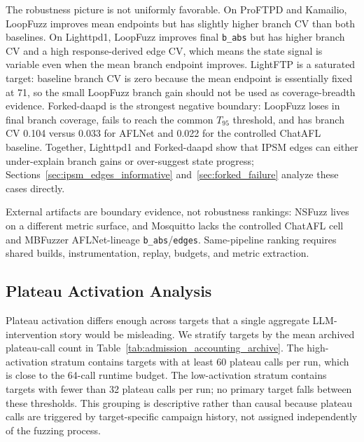 \documentclass[final,5p,times,number]{elsarticle}
\begin{document}
The robustness picture is not uniformly favorable. On ProFTPD and Kamailio, LoopFuzz improves mean endpoints but has slightly higher branch CV than both baselines. On Lighttpd1, LoopFuzz improves final \texttt{b\_abs} but has higher branch CV and a high response-derived edge CV, which means the state signal is variable even when the mean branch endpoint improves. LightFTP is a saturated target: baseline branch CV is zero because the mean endpoint is essentially fixed at 71, so the small LoopFuzz branch gain should not be used as coverage-breadth evidence. Forked-daapd is the strongest negative boundary: LoopFuzz loses in final branch coverage, fails to reach the common $T_{95}$ threshold, and has branch CV 0.104 versus 0.033 for AFLNet and 0.022 for the controlled ChatAFL baseline. Together, Lighttpd1 and Forked-daapd show that IPSM edges can either under-explain branch gains or over-suggest state progress; Sections~\ref{sec:ipsm_edges_informative} and~\ref{sec:forked_failure} analyze these cases directly.

External artifacts are boundary evidence, not robustness rankings: NSFuzz lives on a different metric surface, and Mosquitto lacks the controlled ChatAFL cell and MBFuzzer AFLNet-lineage \texttt{b\_abs}/\texttt{edges}. Same-pipeline ranking requires shared builds, instrumentation, replay, budgets, and metric extraction.

\subsection{Plateau Activation Analysis}
\label{sec:plateau_activation_analysis}

Plateau activation differs enough across targets that a single aggregate LLM-intervention story would be misleading. We stratify targets by the mean archived plateau-call count in Table~\ref{tab:admission_accounting_archive}. The high-activation stratum contains targets with at least 60 plateau calls per run, which is close to the 64-call runtime budget. The low-activation stratum contains targets with fewer than 32 plateau calls per run; no primary target falls between these thresholds. This grouping is descriptive rather than causal because plateau calls are triggered by target-specific campaign history, not assigned independently of the fuzzing process.
\end{document}
